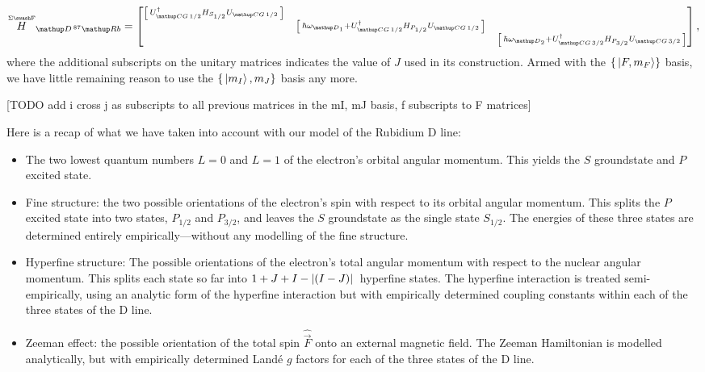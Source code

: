 \begin{align}
\oversetF{H}_{\up{D}\,^{87}\up{Rb}} = 
\left[\begin{matrix}
    \left[\begin{smallmatrix}
        U^\dagger_{\up{CG}\,1/2} H_{S_{1/2}} U_{\up{CG}\,1/2}\\
    \end{smallmatrix} \right]\\
    & \left[\begin{smallmatrix}
        \hbar\omega_{\up{D}_1}+U^\dagger_{\up{CG}\,1/2}H_{P_{1/2}}U_{\up{CG}\,1/2}\\
      \end{smallmatrix} \right]\\
    & &\left[\begin{smallmatrix}
        \hbar\omega_{\up{D}_2}+U^\dagger_{\up{CG}\,3/2}H_{P_{3/2}}U_{\up{CG}\,3/2}\\
        \end{smallmatrix} \right]\\
\end{matrix} \right],
\end{align}
where the additional subscripts on the unitary matrices indicates the value of $J$ used in its construction. Armed with the $\{\ket{F, m_F}\}$ basis, we have little remaining reason to use the $\{\ket{m_I}, {m_J}\}$ basis any more.

[TODO add i cross j as subscripts to all previous matrices in the mI, mJ basis, f subscripts to F matrices]  


Here is a recap of what we have taken into account with our model of the Rubidium D line:
\begin{itemize}
    \item The two lowest quantum numbers $L=0$ and $L=1$ of the electron's orbital angular momentum. This yields the $S$ groundstate and $P$ excited state.
    \item Fine structure: the two possible orientations of the electron's spin with respect to its orbital angular momentum. This splits the $P$ excited state into two states, $P_{1/2}$ and $P_{3/2}$, and leaves the $S$ groundstate as the single state $S_{1/2}$. The energies of these three states are determined entirely empirically---without any modelling of the fine structure.
    \item Hyperfine structure: The possible orientations of the electron's total angular momentum with respect to the nuclear angular momentum. This splits each state so far into $1+J+I - \abs{(I - J)}$ hyperfine states. The hyperfine interaction is treated semi-empirically, using an analytic form of the hyperfine interaction but with empirically determined coupling constants within each of the three states of the D line. 
    \item Zeeman effect: the possible orientation of the total spin $\hat{\vec F}$ onto an external magnetic field. The Zeeman Hamiltonian is modelled analytically, but with empirically determined Land\'e $g$ factors for each of the three states of the D line. 
\end{itemize}

